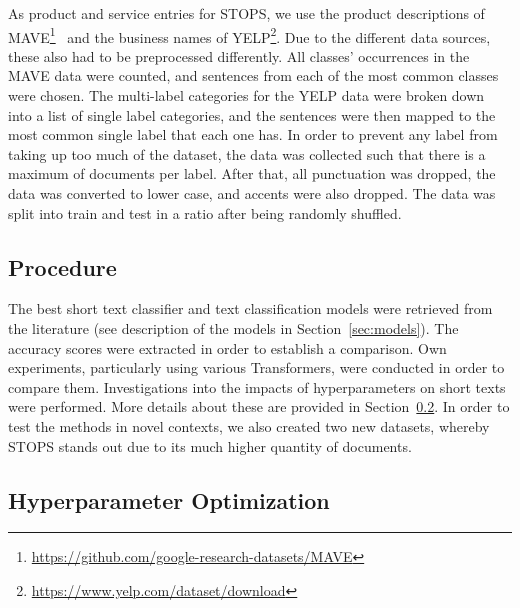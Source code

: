 \documentclass[runningheads]{llncs}
\begin{document}
As product and service entries for STOPS, we use the product descriptions of MAVE\footnote{\url{https://github.com/google-research-datasets/MAVE}}~\cite{yang2022mave} and the business names of YELP\footnote{\url{https://www.yelp.com/dataset/download}}.
Due to the different data sources, these also had to be preprocessed differently.
All classes' occurrences in the MAVE data were counted, and  sentences from each of the  most common classes were chosen.
The multi-label categories for the YELP data were broken down into a list of single label categories, and the sentences were then mapped to the most common single label that each one has. In order to prevent any label from taking up too much of the dataset, the data was collected such that there is a maximum of  documents per label.
After that, all punctuation was dropped, the data was converted to lower case, and accents were also dropped. The data was split into train and test in a  ratio after being randomly shuffled.

\subsection{Procedure}
The best short text classifier and text classification models were retrieved from the literature (see description of the models in Section~\ref{sec:models}).
The accuracy scores were extracted in order to establish a comparison.
Own experiments, particularly using various Transformers, were conducted in order to compare them. Investigations into the impacts of hyperparameters on short texts were performed. More details about these are provided in Section~\ref{sec:hyperparameter}.
In order to test the methods in novel contexts, we also created two new datasets, whereby \ac{STOPS} stands out due to its much higher quantity of documents.

\subsection{Hyperparameter Optimization}
\label{sec:hyperparameter}
\end{document}

